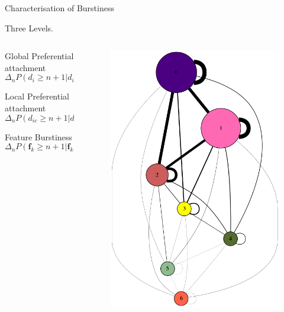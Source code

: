 \begin{frame}[c]{Characterisation of Burstiness}

    Three Levels.


    \begin{columns}[t]
        \begin{column}{0.5\textwidth}
            \begin{definition}{Global Preferential attachment}
                \[ \Delta_n P(d_i \geq n+1 | d_i \geq n) > 0 \]
            \end{definition}
            \begin{definition}{Local Preferential attachment}
                \[ \Delta_n P(d_{ic} \geq n+1 | d_{ic} \geq n) > 0 \]
            \end{definition}
            \begin{definition}{Feature Burstiness}
                \[ \Delta_n P(\bm{f}_k \geq n+1 | \bm{f}_k \geq n) > 0 \]
            \end{definition}
        \end{column}
        \begin{column}{0.5\textwidth}

        \begin{figure}[h]
        \includegraphics[scale=0.25]{img/gdot.png}
        \end{figure}


\end{column}
\end{columns}
\end{frame}
